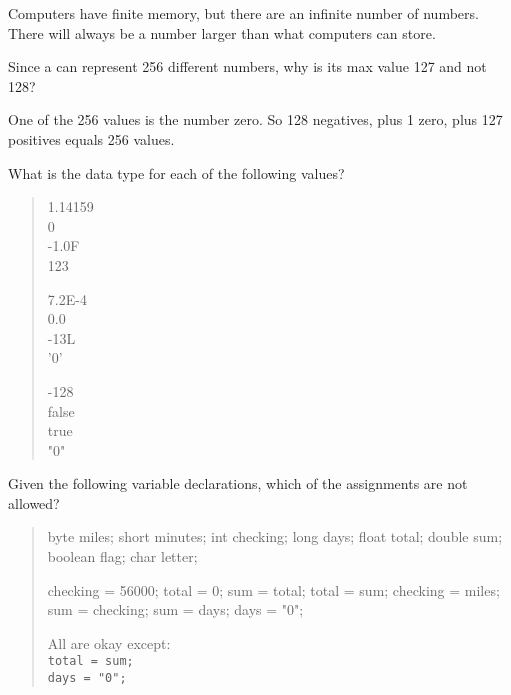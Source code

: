 \begin{answer}
Computers have finite memory, but there are an infinite number of numbers.
There will always be a number larger than what computers can store.
\end{answer}


\Q Since a  can represent 256 different numbers, why is its max value 127 and not 128?

\begin{answer}
One of the 256 values is the number zero. So 128 negatives, plus 1 zero, plus 127 positives equals 256 values.
\end{answer}


\Q What is the data type for each of the following values?

\begin{quote}
\begin{multicols}{3}
1.14159  \\[1ex]
0        \\[1ex]
-1.0F    \\[1ex]
123     

7.2E-4   \\[1ex]
0.0      \\[1ex]
-13L     \\[1ex]
'0'     

-128     \\[1ex]
false    \\[1ex]
true     \\[1ex]
"0"     
\end{multicols}
\end{quote}


\Q Given the following variable declarations, which of the assignments are not allowed?

\begin{quote}
\begin{multicols}{3}

\begin{javalst}
byte miles;
short minutes;
int checking;
long days;
float total;
double sum;
boolean flag;
char letter;
\end{javalst}

\columnbreak

\begin{javalst}
checking = 56000;
total = 0;
sum = total;
total = sum;
checking = miles;
sum = checking;
sum = days;
days = "0";
\end{javalst}

\columnbreak

\begin{answer}
All are okay except:
\\ \hspace*{1em} \texttt{total = sum;}
\\ \hspace*{1em} \texttt{days = "0";}
\end{answer}

\end{multicols}
\end{quote}


